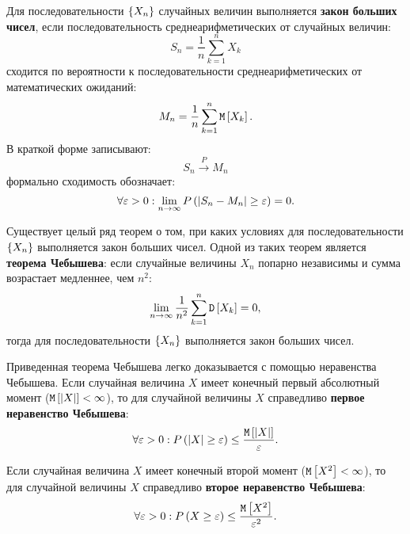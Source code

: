 Для последовательности $\left \{ X_n \right \}$ случайных величин выполняется \textbf{закон больших чисел}, если последовательность среднеарифметических от случайных величин:
\begin{equation}
    S_n = \frac{1}{n} \sum_{k=1}^n X_k
\end{equation}
сходится по вероятности к последовательности среднеарифметических от математических ожиданий:
\begin{equation}
    M_n = \frac{1}{n} \sum_{k=1}^n \mathtt{M} \left [ X_k \right ] .
\end{equation}
В краткой форме записывают:
\begin{equation}
    S_n \stackrel{P}{\longrightarrow} M_n
\end{equation}
формально сходимость обозначает:
\begin{equation}
    \forall \varepsilon > 0: \lim_{n \rightarrow \infty} P \left (  \left |  S_n - M_n  \right | \ge \varepsilon  \right ) = 0 .
\end{equation}

Существует целый ряд теорем о том, при каких условиях для последовательности $\left \{ X_n \right \}$ выполняется закон больших чисел.
Одной из таких теорем является \textbf{теорема Чебышева}: если случайные величины $X_n$ попарно независимы и сумма возрастает медленнее, чем $n^2$:
\begin{equation}
    \lim_{n \rightarrow \infty} \frac{1}{n^2} \sum_{k=1}^n \mathtt{D} \left [ X_k \right ] = 0 ,
\end{equation}
тогда для последовательности $\left \{ X_n \right \}$ выполняется закон больших чисел.

Приведенная теорема Чебышева легко доказывается с помощью неравенства Чебышева. Если случайная величина $X$ имеет конечный первый абсолютный момент
($\mathtt{M} \left [ \left | X \right | \right ] < \infty$), то для случайной величины $X$ справедливо \textbf{первое неравенство Чебышева}:
\begin{equation}
    \forall \varepsilon > 0 : P \left (  \left | X \right | \ge \varepsilon  \right ) \le \frac{\mathtt{M} \left [ \left | X \right | \right ]}{\varepsilon} .
\end{equation}

Если случайная величина $X$ имеет конечный второй момент ($\mathtt{M} \left [ X^2 \right ] < \infty$), то для случайной величины $X$ справедливо \textbf{второе неравенство Чебышева}:
\begin{equation}
    \forall \varepsilon > 0 : P \left (  X \ge \varepsilon  \right ) \le \frac{\mathtt{M} \left [ X^2 \right ]}{\varepsilon^2} .
\end{equation}

